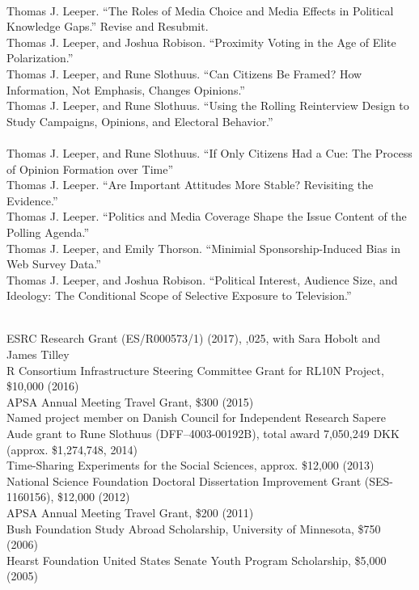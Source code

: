 \documentclass[12pt]{article}
\renewcommand{\section}[1]{\pagebreak[3]%
    \llap{\scshape\smash{\parbox[t]{\marginparwidth}{\raggedright {\color{lg}#1}}}}%
    \vspace{-\baselineskip}\par}
\newcommand{\topic}[1]{\pagebreak[3]\indent {\color{lg}{\footnotesize #1 }}\\}
\newcommand{\entry}[1]{\indent {\color{lg}\guillemotright}\hspace{2pt}#1\vspace{.25em}\\}
\begin{document}
\section{Working Papers\\ \& Ongoing Projects}
\topic{Papers Under Review}
	\entry{Thomas J. Leeper. ``The Roles of Media Choice and Media Effects in Political Knowledge Gaps.'' Revise and Resubmit.}
	\entry{Thomas J. Leeper, and Joshua Robison. ``Proximity Voting in the Age of Elite Polarization.''}
	\entry{Thomas J. Leeper, and Rune Slothuus. ``Can Citizens Be Framed? How Information, Not Emphasis, Changes Opinions.''}
	\entry{Thomas J. Leeper, and Rune Slothuus. ``Using the Rolling Reinterview Design to Study Campaigns, Opinions, and Electoral Behavior.''}

\topic{Working Papers}
	\entry{Thomas J. Leeper, and Rune Slothuus. ``If Only Citizens Had a Cue: The Process of Opinion Formation over Time''}
	\entry{Thomas J. Leeper. ``Are Important Attitudes More Stable? Revisiting the Evidence.''}
	\entry{Thomas J. Leeper. ``Politics and Media Coverage Shape the Issue Content of the Polling Agenda.''}
	\entry{Thomas J. Leeper, and Emily Thorson. ``Minimial Sponsorship-Induced Bias in Web Survey Data.''}
	\entry{Thomas J. Leeper, and Joshua Robison. ``Political Interest, Audience Size, and Ideology: The Conditional Scope of Selective Exposure to Television.''}

\section{Grants \&\\Funding}
\topic{External Sources}
	\entry{ESRC Research Grant (ES/R000573/1) (2017), ,025, with Sara Hobolt and James Tilley}
    \entry{R Consortium Infrastructure Steering Committee Grant for RL10N Project, \$10,000 (2016)}
	\entry{APSA Annual Meeting Travel Grant, \$300 (2015)}
	\entry{Named project member on Danish Council for Independent Research Sapere Aude grant to Rune Slothuus (DFF--4003-00192B), total award 7,050,249 DKK (approx. \$1,274,748, 2014)}
	\entry{Time-Sharing Experiments for the Social Sciences, approx. \$12,000 (2013)}
	\entry{National Science Foundation Doctoral Dissertation Improvement Grant (SES-1160156), \$12,000 (2012)}
	\entry{APSA Annual Meeting Travel Grant, \$200 (2011)}
	\entry{Bush Foundation Study Abroad Scholarship, University of Minnesota, \$750 (2006)}
	\entry{Hearst Foundation United States Senate Youth Program Scholarship, \$5,000 (2005)}
	
\end{document}
